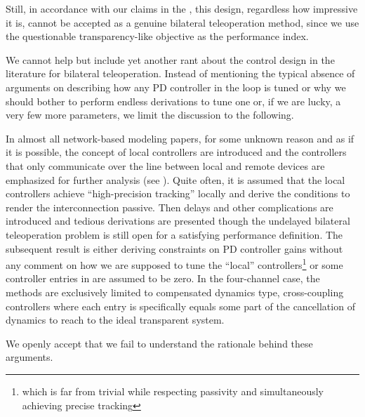Still, in accordance with our claims in the , this design, regardless how impressive it is, cannot be accepted as a genuine 
bilateral teleoperation method, since we use the questionable transparency-like objective as the performance index.


We cannot help but include yet another rant about the control design in the literature for bilateral teleoperation. Instead of mentioning the typical 
absence of arguments on describing how any PD controller in the loop is tuned or why we should bother to perform endless derivations to tune one 
or, if we are lucky, a very few more parameters, we limit the discussion to the following. 

In almost all network-based modeling papers, for some unknown reason and as if it is possible, the concept of local controllers are introduced 
and the controllers that only communicate over the line between local and remote devices are emphasized for further analysis (see ). 
Quite often, it is assumed that the local controllers achieve \enquote{high-precision tracking} locally and derive the conditions to render 
the interconnection passive. Then delays and other complications are introduced and tedious derivations are presented though the undelayed bilateral
teleoperation problem is still open for a satisfying performance definition. The subsequent result is either deriving constraints on PD controller 
gains without any comment on how we are supposed to tune the \enquote{local} controllers\footnote{which is far from trivial while respecting  
passivity and simultaneously achieving precise tracking} or some controller entries in  are assumed to be zero. In the 
four-channel case, the methods are exclusively limited to compensated dynamics type, cross-coupling controllers where each entry is specifically 
equals some part of the cancellation of dynamics to reach to the ideal transparent system. 

We openly accept that we fail to understand the rationale behind these arguments.

